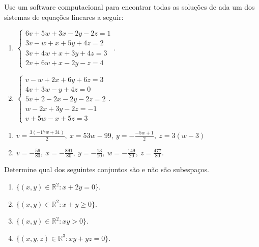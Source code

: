 \begin{question}
  Use um software computacional para encontrar todas as soluções de ada um dos sistemas de equações lineares a seguir:
  \begin{multicols}{2}
    \begin{enumerate}[label=\alph*)]
      \item $\begin{cases}
                6v + 5w +3x-2y-2z=1 \\
                3v-w+x+5y+4z=2      \\
                3v + 4w+x+3y+4z=3   \\
                2v+6w+x-2y-z=4
              \end{cases}$.
      \item $\begin{cases}
                v-w+2x+6y+6z =3 \\
                4v+3w-y+4z=0    \\
                5v+2-2x-2y-2z=2 \\
                w-2x+3y-2z=-1   \\
                v+5w-x+5z=3
              \end{cases}$.
    \end{enumerate}
  \end{multicols}
  \vspace{8pt}
\end{question}

\begin{resolution}
  \vspace{-24pt}
  \begin{enumerate}[label=\alph*)]
    \item $v=\frac{3\left(-17w+31\right)}{2},\:x=53w-99,\:y=-\frac{-5w+1}{2},\:z=3\left(w-3\right)$
    \item $v=-\frac{56}{80},\:x=-\frac{891}{80},\:y=-\frac{13}{10},\:w=-\frac{149}{20},\:z=\frac{477}{80}$.
  \end{enumerate}
\end{resolution}

\begin{question}
  Determine qual dos seguintes conjuntos são e não são subespaços.
  \begin{enumerate}[label=\alph*)]
    \item $\{(x, y) \in \mathbb{R}^2 : x + 2y = 0\}$.
    \item $\{(x, y) \in \mathbb{R}^2 : x+y \geq 0\}$.
    \item $\{(x, y) \in \mathbb{R}^2 : xy > 0\}$.
    \item $\{(x, y, z) \in \mathbb{R}^3 : xy + yz = 0\}$.
  \end{enumerate}
\end{question}

